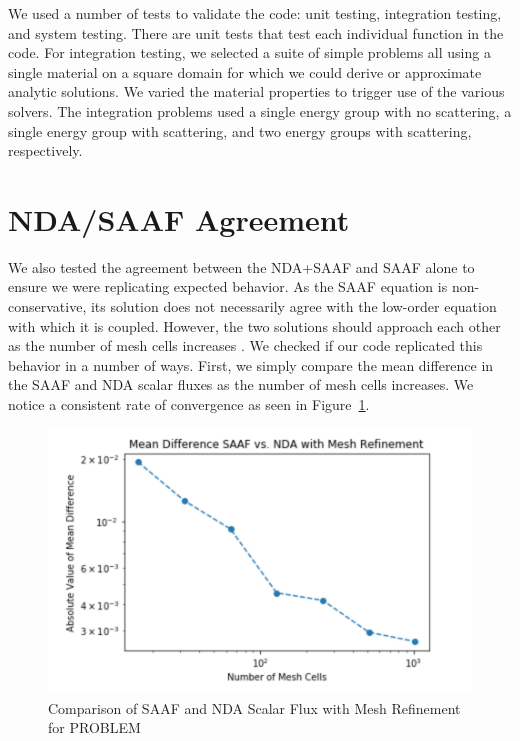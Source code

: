 We used a number of tests to validate the code: unit testing, integration testing, and system testing. There are unit tests that test each individual function in the code. For integration testing, we selected a suite of simple problems all using a single material on a square domain for which we could derive or approximate analytic solutions. We varied the material properties to trigger use of the various solvers. The integration problems used a single energy group with no scattering, a single energy group with scattering, and two energy groups with scattering, respectively. 

\section{NDA/SAAF Agreement}

We also tested the agreement between the NDA+SAAF and SAAF alone to ensure we were replicating expected behavior. As the SAAF equation is non-conservative, its solution does not necessarily agree with the low-order equation with which it is coupled. However, the two solutions should approach each other as the number of mesh cells increases \cite{Wang2013}. We checked if our code replicated this behavior in a number of ways. First, we simply compare the mean difference in the SAAF and NDA scalar fluxes as the number of mesh cells increases. We notice a consistent rate of convergence as seen in Figure~\ref{fig:SAAFvsNDA}. 
%
\begin{figure}[H]
    \centering
    \includegraphics[width=.75\textwidth]{fig/NDAvsSAAF.png}
    \caption{Comparison of SAAF and NDA Scalar Flux with Mesh Refinement for PROBLEM}
    \label{fig:SAAFvsNDA}
\end{figure}

